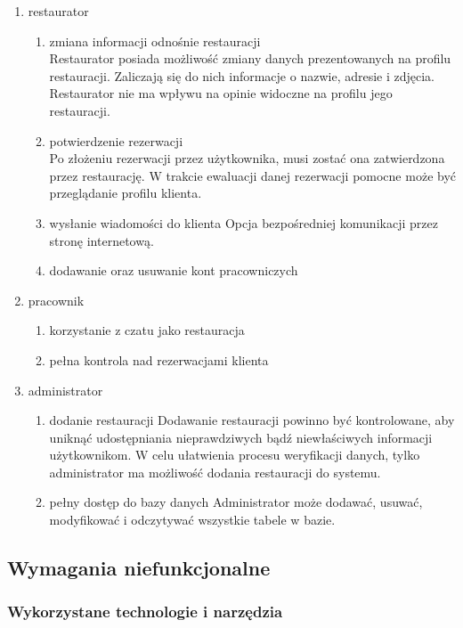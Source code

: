 \documentclass{article}
\begin{document}
\begin{enumerate}
\begin{enumerate}
\end{enumerate}
\item restaurator
\begin{enumerate}
	\item zmiana informacji odnośnie restauracji \\
	Restaurator posiada możliwość zmiany danych prezentowanych na profilu restauracji. Zaliczają się do nich informacje o nazwie, adresie i zdjęcia. Restaurator nie ma wpływu na opinie widoczne na profilu jego restauracji.
	\item potwierdzenie rezerwacji \\
	Po złożeniu rezerwacji przez użytkownika, musi zostać ona zatwierdzona przez restaurację. W trakcie ewaluacji danej rezerwacji pomocne może być przeglądanie profilu klienta.
	\item wysłanie wiadomości do klienta
	Opcja bezpośredniej komunikacji przez stronę internetową.
	\item dodawanie oraz usuwanie kont pracowniczych
\end{enumerate}
\item pracownik
\begin{enumerate}
	\item korzystanie z czatu jako restauracja
	\item pełna kontrola nad rezerwacjami klienta
\end{enumerate}
\item administrator
\begin{enumerate}
	\item dodanie restauracji
	Dodawanie restauracji powinno być kontrolowane, aby uniknąć udostępniania nieprawdziwych bądź niewłaściwych informacji użytkownikom. W celu ułatwienia procesu weryfikacji danych, tylko administrator ma możliwość dodania restauracji do systemu.
	\item pełny dostęp do bazy danych
	Administrator może dodawać, usuwać, modyfikować i odczytywać wszystkie tabele w bazie. 
\end{enumerate}
\end{enumerate}


\subsection{Wymagania niefunkcjonalne}

\subsubsection{Wykorzystane technologie i narzędzia}
\end{document}
